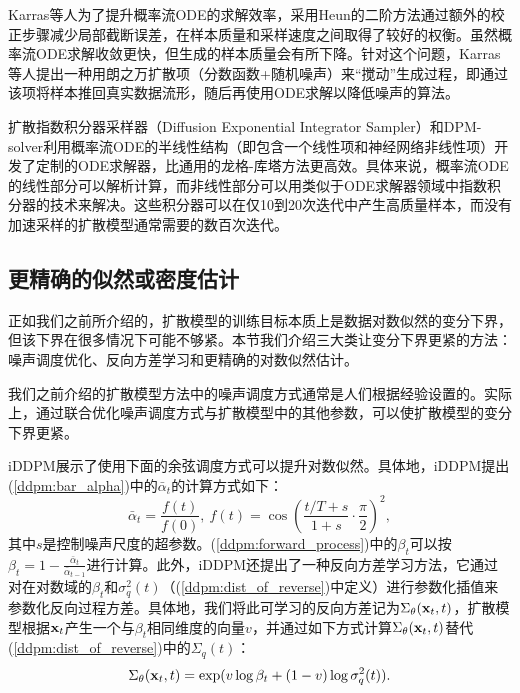 \documentclass[11pt,a4paper,UTF8]{ctexart}
\begin{document}
Karras等人\cite{karras2022elucidating}为了提升概率流ODE的求解效率，采用Heun的二阶方法\cite{ascher1998computer}通过额外的校正步骤减少局部截断误差，在样本质量和采样速度之间取得了较好的权衡。虽然概率流ODE求解收敛更快，但生成的样本质量会有所下降。针对这个问题，Karras等人\cite{karras2022elucidating}提出一种用朗之万扩散项（分数函数+随机噪声）来“搅动”生成过程，即通过该项将样本推回真实数据流形，随后再使用ODE求解以降低噪声的算法。


扩散指数积分器采样器（Diffusion Exponential Integrator Sampler）\cite{zhang2022fast}和DPM-solver\cite{lu2022dpm}利用概率流ODE的半线性结构（即包含一个线性项和神经网络非线性项）开发了定制的ODE求解器，比通用的龙格-库塔方法更高效。具体来说，概率流ODE的线性部分可以解析计算，而非线性部分可以用类似于ODE求解器领域中指数积分器的技术来解决。这些积分器可以在仅10到20次迭代中产生高质量样本，而没有加速采样的扩散模型通常需要的数百次迭代。

\subsection{更精确的似然或密度估计}

正如我们之前所介绍的，扩散模型的训练目标本质上是数据对数似然的变分下界，但该下界在很多情况下可能不够紧。本节我们介绍三大类让变分下界更紧的方法：噪声调度优化、反向方差学习和更精确的对数似然估计。

我们之前介绍的扩散模型方法中的噪声调度方式通常是人们根据经验设置的。实际上，通过联合优化噪声调度方式与扩散模型中的其他参数，可以使扩散模型的变分下界更紧\cite{kingma2021variational,nichol2021improved}。

iDDPM\cite{nichol2021improved}展示了使用下面的余弦调度方式可以提升对数似然。具体地，iDDPM提出(\ref{ddpm:bar_alpha})中的$\bar{\alpha}_t$的计算方式如下：
\begin{equation*}
    \bar{\alpha}_t=\frac{f(t)}{f(0)},\ f(t)=\cos\left(\frac{t/T+s}{1+s}\cdot\frac{\pi}{2}\right)^2,
\end{equation*}
其中$s$是控制噪声尺度的超参数。(\ref{ddpm:forward_process})中的$\beta_t$可以按$\beta_t=1-\frac{\bar{\alpha}_t}{\bar{\alpha}_{t-1}}$进行计算。此外，iDDPM还提出了一种反向方差学习方法，它通过对在对数域的$\beta_t$和$\sigma_q^2(t)$（(\ref{ddpm:dist_of_reverse})中定义）进行参数化插值来参数化反向过程方差。具体地，我们将此可学习的反向方差记为$\Sigma_\theta(\mathbf{x}_t,t)$，扩散模型根据$\mathbf{x}_t$产生一个与$\beta_t$相同维度的向量$v$，并通过如下方式计算$\Sigma_\theta(\mathbf{x}_t,t)$替代(\ref{ddpm:dist_of_reverse})中的$\Sigma_q(t)$：
\begin{equation*}
    \Sigma_\theta(\mathbf{x}_t,t)=\exp (v\log\beta_t + (1-v)\log \sigma_q^2(t)).
\end{equation*}
\end{document}
